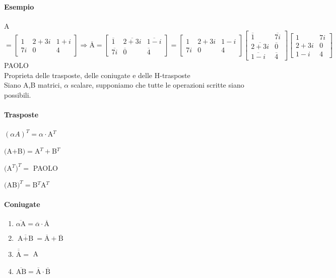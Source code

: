 \paragraph{Esempio} 
A$=
\begin{bmatrix} 
    1 & 2+3i & 1+i\\
    7i & 0 & 4
\end{bmatrix} 
\Longrightarrow
\overline{\textrm{A}}=
\begin{bmatrix}
    \overline{1} & \overline{2+3i} & \overline{1-i}\\
    \overline{7i} & \overline{0} & \overline{4}
\end{bmatrix}=
\begin{bmatrix}
    {1} & {2+3i} & {1-i}\\
    {7i} & {0} & {4}
\end{bmatrix}
\begin{bmatrix}
    \overline{1} & \overline{7i} \\
    \overline{2+3i} & \overline{0} \\
    \overline{1-i} & \overline{4} 
\end{bmatrix}
\begin{bmatrix}
    {1} & {7i} \\
    {2+3i} & {0} \\
    {1-i} & {4} 
\end{bmatrix}
$
{\color{purple} PAOLO}\\

{\color{red} 
Proprieta delle trasposte, delle coniugate e delle H-trasposte
}\\
Siano A,B matrici, $\alpha$ scalare, supponiamo che tutte le operazioni scritte siano possibili.
\paragraph{Trasposte}
\begin{enumerate}
    \item $(\alpha A)^T=\alpha\cdot$A$^T$
    \item $($A$+$B$)=$A$^T+$B$^T$
    \item $($A$^T)^T=$ PAOLO
        {\color{red}
    \item $($AB$)^T=$B$^T$A$^T$
        }
\end{enumerate}

\paragraph{Coniugate}
\begin{enumerate} 
    \item $\overline{\alpha\textrm{A}}=\overline{\alpha}\cdot\overline{\textrm{A}}$
    \item $\overline{\textrm{A}+\textrm{B}}=\overline{\textrm{A}}+\overline{\textrm{B}}$
    \item $\overline{\overline{\textrm{A}}}=$ A
    \item $\overline{\textrm{AB}}=\overline{\textrm{A}}\cdot\overline{\textrm{B}}$ 
\end{enumerate} 

